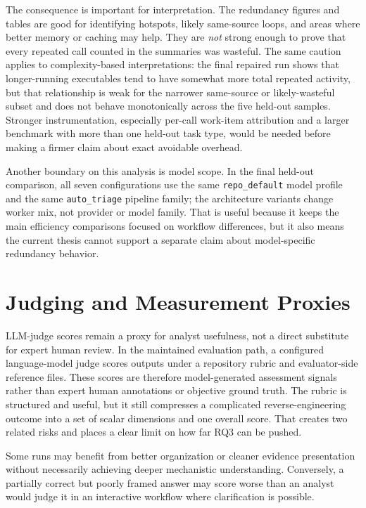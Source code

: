 The consequence is important for interpretation. The redundancy figures and tables are good for identifying hotspots, likely same-source loops, and areas where better memory or caching may help. They are \emph{not} strong enough to prove that every repeated call counted in the summaries was wasteful. The same caution applies to complexity-based interpretations: the final repaired run shows that longer-running executables tend to have somewhat more total repeated activity, but that relationship is weak for the narrower same-source or likely-wasteful subset and does not behave monotonically across the five held-out samples. Stronger instrumentation, especially per-call work-item attribution and a larger benchmark with more than one held-out task type, would be needed before making a firmer claim about exact avoidable overhead.

Another boundary on this analysis is model scope. In the final held-out comparison, all seven configurations use the same \texttt{repo\_default} model profile and the same \texttt{auto\_triage} pipeline family; the architecture variants change worker mix, not provider or model family. That is useful because it keeps the main efficiency comparisons focused on workflow differences, but it also means the current thesis cannot support a separate claim about model-specific redundancy behavior.

\section{Judging and Measurement Proxies}

LLM-judge scores remain a proxy for analyst usefulness, not a direct substitute for expert human review. In the maintained evaluation path, a configured language-model judge scores outputs under a repository rubric and evaluator-side reference files. These scores are therefore model-generated assessment signals rather than expert human annotations or objective ground truth. The rubric is structured and useful, but it still compresses a complicated reverse-engineering outcome into a set of scalar dimensions and one overall score. That creates two related risks and places a clear limit on how far RQ3 can be pushed.

Some runs may benefit from better organization or cleaner evidence presentation without necessarily achieving deeper mechanistic understanding. Conversely, a partially correct but poorly framed answer may score worse than an analyst would judge it in an interactive workflow where clarification is possible.


